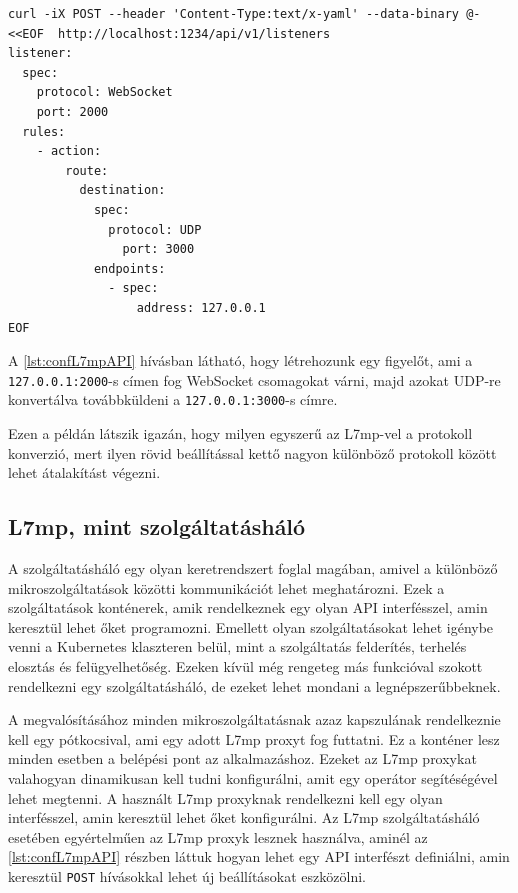 \begin{lstlisting}[caption=L7mp konfigurálása API-n keresztül, label=lst:confL7mpAPI]
curl -iX POST --header 'Content-Type:text/x-yaml' --data-binary @- <<EOF  http://localhost:1234/api/v1/listeners
listener:
  spec:
    protocol: WebSocket
    port: 2000
  rules:
    - action:
        route:
          destination:
            spec:
              protocol: UDP
                port: 3000
            endpoints:
              - spec:
                  address: 127.0.0.1
EOF
\end{lstlisting}

A \ref{lst:confL7mpAPI} hívásban látható, hogy létrehozunk egy figyelőt, ami a 
\texttt{127.0.0.1:2000}-s címen fog WebSocket csomagokat várni, majd azokat UDP-re 
konvertálva továbbküldeni a \texttt{127.0.0.1:3000}-s címre.

Ezen a példán látszik igazán, hogy milyen egyszerű az L7mp-vel a protokoll konverzió,
mert ilyen rövid beállítással kettő nagyon különböző protokoll között lehet 
átalakítást végezni.

\subsection{L7mp, mint szolgáltatásháló}

A szolgáltatásháló egy olyan keretrendszert foglal magában, amivel a különböző 
mikroszolgáltatások közötti kommunikációt lehet meghatározni. Ezek a szolgáltatások 
konténerek, amik rendelkeznek egy olyan API interfésszel, amin keresztül lehet 
őket programozni. Emellett olyan szolgáltatásokat lehet igénybe venni a Kubernetes 
klaszteren belül, mint a szolgáltatás felderítés, terhelés elosztás és felügyelhetőség. 
Ezeken kívül még rengeteg más funkcióval szokott rendelkezni egy szolgáltatásháló, de 
ezeket lehet mondani a legnépszerűbbeknek.

A megvalósításához minden mikroszolgáltatásnak azaz kapszulának rendelkeznie kell 
egy pótkocsival, ami egy adott L7mp proxyt fog futtatni. Ez a konténer lesz minden esetben
a belépési pont az alkalmazáshoz. Ezeket az L7mp proxykat valahogyan dinamikusan kell 
tudni konfigurálni, amit egy operátor segítéségével lehet megtenni. A használt L7mp 
proxyknak rendelkezni kell egy olyan interfésszel, amin keresztül lehet őket 
konfigurálni. Az L7mp szolgáltatásháló esetében egyértelműen az L7mp proxyk lesznek használva, aminél az \ref{lst:confL7mpAPI} részben láttuk hogyan lehet egy API 
interfészt definiálni, amin keresztül \texttt{POST} hívásokkal lehet új beállításokat 
eszközölni.

